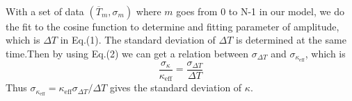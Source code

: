 \documentclass{article}
\begin{document}
\begin{itemize}
\paragraph*{}
With a set of data $(\overline{T}_m,\sigma_m)$ where $m$ goes from 0 to N-1 in our model, we do the fit to the cosine function to determine and fitting parameter of amplitude, which is $\Delta T$ in Eq.(1). The standard deviation of $\Delta T$ is determined at the same time.Then by using Eq.(2) we can get a relation between $\sigma_{\Delta T}$ and $\sigma_{\kappa_{\mbox{eff}}}$, which is
\begin{equation}
\frac{\sigma_{\kappa}}{\kappa_{\mbox{eff}}}=\frac{\sigma_{\Delta T}}{\Delta T}
\end{equation}
Thus $\sigma_{\kappa_{\mbox{eff}}}=\kappa_{\mbox{eff}}\sigma_{\Delta{T}}/\Delta{T}$ gives the standard deviation of $\kappa$.
\end{itemize}
\end{document}
